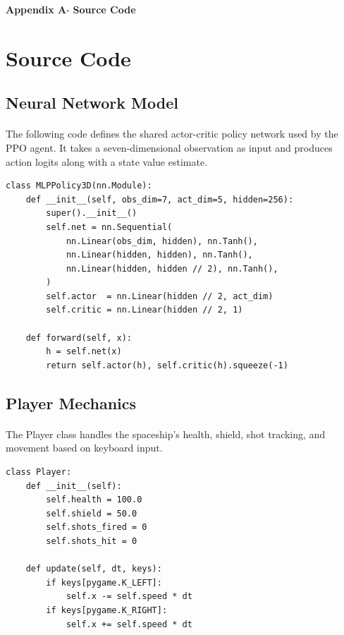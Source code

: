 \begin{center}
	{\Large \textbf{Appendix A}}-\vspace*{0.5 cm}
	{\Large \textbf{Source Code}}
	
\end{center}

\section{Source Code}

\subsection{Neural Network Model}
\paragraph{} The following code defines the shared actor-critic policy network used by the PPO agent. It takes a seven-dimensional observation as input and produces action logits along with a state value estimate.

\begin{verbatim}
class MLPPolicy3D(nn.Module):
    def __init__(self, obs_dim=7, act_dim=5, hidden=256):
        super().__init__()
        self.net = nn.Sequential(
            nn.Linear(obs_dim, hidden), nn.Tanh(),
            nn.Linear(hidden, hidden), nn.Tanh(),
            nn.Linear(hidden, hidden // 2), nn.Tanh(),
        )
        self.actor  = nn.Linear(hidden // 2, act_dim)
        self.critic = nn.Linear(hidden // 2, 1)

    def forward(self, x):
        h = self.net(x)
        return self.actor(h), self.critic(h).squeeze(-1)
\end{verbatim}

\subsection{Player Mechanics}
\paragraph{} The Player class handles the spaceship's health, shield, shot tracking, and movement based on keyboard input.

\begin{verbatim}
class Player:
    def __init__(self):
        self.health = 100.0
        self.shield = 50.0
        self.shots_fired = 0
        self.shots_hit = 0

    def update(self, dt, keys):
        if keys[pygame.K_LEFT]:
            self.x -= self.speed * dt
        if keys[pygame.K_RIGHT]:
            self.x += self.speed * dt
\end{verbatim}

